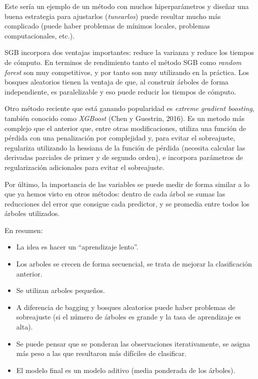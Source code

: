 \documentclass[
]{book}
\theoremstyle{break}
\theoremstyle{definition}
\theoremstyle{definition}
\theoremstyle{definition}
\theoremstyle{remark}
\begin{document}
Este sería un ejemplo de un método con muchos hiperparámetros y diseñar una buena estrategia para ajustarlos (\emph{tunearlos}) puede resultar mucho más complicado (puede haber problemas de mínimos locales, problemas computacionales, etc.).

SGB incorpora dos ventajas importantes: reduce la varianza y reduce los tiempos de cómputo.
En terminos de rendimiento tanto el método SGB como \emph{random forest} son muy competitivos, y por tanto son muy utilizando en la práctica.
Los bosques aleatorios tienen la ventaja de que, al construir árboles de forma independiente, es paralelizable y eso puede reducir los tiempos de cómputo.

Otro método reciente que está ganando popularidad es \emph{extreme gradient boosting}, también conocido como \emph{XGBoost} (Chen y Guestrin, 2016).
Es un metodo más complejo que el anterior que, entre otras modificaciones, utiliza una función de pérdida con una penalización por complejidad y, para evitar el sobreajuste, regulariza utilizando la hessiana de la función de pérdida (necesita calcular las derivadas parciales de primer y de segundo orden), e incorpora parámetros de regularización adicionales para evitar el sobreajuste.

Por último, la importancia de las variables se puede medir de forma similar a lo que ya hemos visto en otros métodos: dentro de cada árbol se sumas las reducciones del error que consigue cada predictor, y se promedia entre todos los árboles utilizados.

En resumen:

\begin{itemize}
\item
  La idea es hacer un ``aprendizaje lento''.
\item
  Los arboles se crecen de forma secuencial, se trata de mejorar la
  clasificación anterior.
\item
  Se utilizan arboles pequeños.
\item
  A diferencia de bagging y bosques aleatorios puede haber problemas de sobreajuste (si el número de árboles es grande y la tasa de aprendizaje es alta).
\item
  Se puede pensar que se ponderan las observaciones iterativamente, se
  asigna más peso a las que resultaron más difíciles de clasificar.
\item
  El modelo final es un modelo aditivo (media ponderada de los
  árboles).
\end{itemize}
\end{document}
